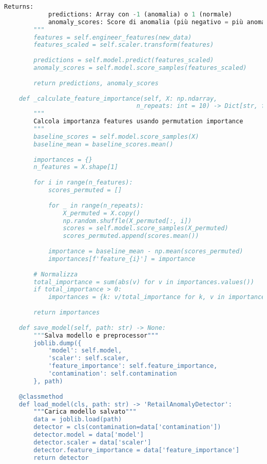 \begin{lstlisting}[language=Python, caption=Isolation Forest per Anomaly Detection GDO]
        Returns:
            predictions: Array con -1 (anomalia) o 1 (normale)
            anomaly_scores: Score di anomalia (più negativo = più anomalo)
        """
        features = self.engineer_features(new_data)
        features_scaled = self.scaler.transform(features)
        
        predictions = self.model.predict(features_scaled)
        anomaly_scores = self.model.score_samples(features_scaled)
        
        return predictions, anomaly_scores
    
    def _calculate_feature_importance(self, X: np.ndarray, 
                                    n_repeats: int = 10) -> Dict[str, float]:
        """
        Calcola importanza features usando permutation importance
        """
        baseline_scores = self.model.score_samples(X)
        baseline_mean = baseline_scores.mean()
        
        importances = {}
        n_features = X.shape[1]
        
        for i in range(n_features):
            scores_permuted = []
            
            for _ in range(n_repeats):
                X_permuted = X.copy()
                np.random.shuffle(X_permuted[:, i])
                scores = self.model.score_samples(X_permuted)
                scores_permuted.append(scores.mean())
            
            importance = baseline_mean - np.mean(scores_permuted)
            importances[f'feature_{i}'] = importance
        
        # Normalizza
        total_importance = sum(abs(v) for v in importances.values())
        if total_importance > 0:
            importances = {k: v/total_importance for k, v in importances.items()}
        
        return importances
    
    def save_model(self, path: str) -> None:
        """Salva modello e preprocessor"""
        joblib.dump({
            'model': self.model,
            'scaler': self.scaler,
            'feature_importance': self.feature_importance,
            'contamination': self.contamination
        }, path)
    
    @classmethod
    def load_model(cls, path: str) -> 'RetailAnomalyDetector':
        """Carica modello salvato"""
        data = joblib.load(path)
        detector = cls(contamination=data['contamination'])
        detector.model = data['model']
        detector.scaler = data['scaler']
        detector.feature_importance = data['feature_importance']
        return detector
\end{lstlisting}

